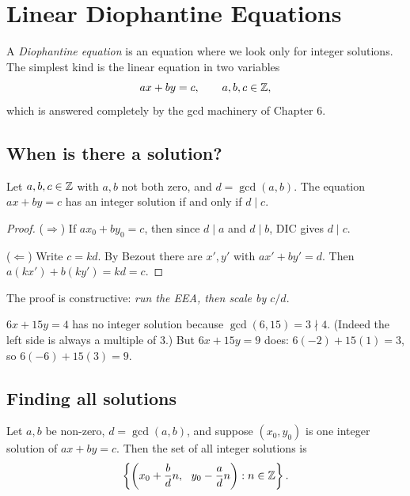 \chapter{Linear Diophantine Equations}

A \emph{Diophantine equation} is an equation where we look only for integer solutions. The
simplest kind is the linear equation in two variables
\[ ax + by = c, \qquad a,b,c \in \mathbb{Z}, \]
which is answered completely by the gcd machinery of Chapter 6.

\section{When is there a solution?}

\begin{theorem}
Let $a,b,c \in \mathbb{Z}$ with $a,b$ not both zero, and $d = \gcd(a,b)$. The equation $ax + by = c$
has an integer solution if and only if $d \mid c$.
\end{theorem}
\begin{proof}
($\Rightarrow$) If $ax_0 + by_0 = c$, then since $d \mid a$ and $d\mid b$, DIC gives $d \mid c$.

($\Leftarrow$) Write $c = kd$. By Bezout there are $x',y'$ with $ax' + by' = d$. Then
$a(kx') + b(ky') = kd = c$.
\end{proof}

The proof is constructive: \emph{run the EEA, then scale by $c/d$}.

\begin{example}
$6x + 15y = 4$ has no integer solution because $\gcd(6,15) = 3 \nmid 4$. (Indeed the left side is
always a multiple of $3$.) But $6x + 15y = 9$ does: $6(-2) + 15(1) = 3$, so
$6(-6) + 15(3) = 9$.
\end{example}

\section{Finding all solutions}

\begin{theorem}
Let $a,b$ be non-zero, $d = \gcd(a,b)$, and suppose $(x_0, y_0)$ is one integer solution of
$ax + by = c$. Then the set of all integer solutions is
\[ \left\{ \left(x_0 + \frac bd n,\ \ y_0 - \frac ad n\right) : n \in \mathbb{Z} \right\}. \]
\end{theorem}

